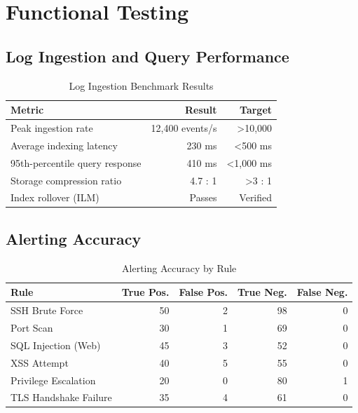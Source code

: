 \documentclass[12pt,a4paper]{report}
\begin{document}
\section{Functional Testing}

\subsection{Log Ingestion and Query Performance}

\begin{table}[H]
\centering
\caption{Log Ingestion Benchmark Results}
\label{tab:perf}
\begin{tabular}{lrr}
\toprule
\textbf{Metric} & \textbf{Result} & \textbf{Target} \\
\midrule
Peak ingestion rate            & 12,400 events/s & \textgreater 10,000 \\
Average indexing latency        & 230 ms          & \textless 500 ms \\
95th-percentile query response  & 410 ms          & \textless 1,000 ms \\
Storage compression ratio       & 4.7 : 1         & \textgreater 3 : 1 \\
Index rollover (ILM)            & Passes          & Verified \\
\bottomrule
\end{tabular}
\end{table}

\subsection{Alerting Accuracy}

\begin{table}[H]
\centering
\caption{Alerting Accuracy by Rule}
\label{tab:alerts}
\begin{tabular}{lrrrr}
\toprule
\textbf{Rule} & \textbf{True Pos.} & \textbf{False Pos.} & \textbf{True Neg.} & \textbf{False Neg.} \\
\midrule
SSH Brute Force         & 50 & 2  & 98 & 0 \\
Port Scan               & 30 & 1  & 69 & 0 \\
SQL Injection (Web)     & 45 & 3  & 52 & 0 \\
XSS Attempt             & 40 & 5  & 55 & 0 \\
Privilege Escalation    & 20 & 0  & 80 & 1 \\
TLS Handshake Failure   & 35 & 4  & 61 & 0 \\
\bottomrule
\end{tabular}
\end{table}
\end{document}
